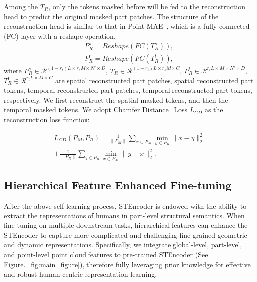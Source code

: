 Among the $T_R$, only the tokens masked before will be fed to the reconstruction head to predict the original masked part patches. The structure of the reconstruction head is similar to that in Point-MAE~\cite{pang2022masked}, which is a fully connected (FC) layer with a reshape operation.
\begin{equation}
    \begin{aligned}
    P^s_R = Reshape(FC(T^s_R)), \\
    P^t_R = Reshape(FC(T^t_R)), 
    \end{aligned}
\end{equation}
where $P^s_R \in \mathcal{R}^{(1-r_t)L \times r_sM \times N' \times D}$, $T^s_R \in \mathcal{R}^{(1-r_t)L \times r_sM \times C}$, $P^t_R \in \mathcal{R}^{r_tL \times M \times N' \times D}$, $T^t_R \in \mathcal{R}^{r_tL \times M \times C}$ are spatial reconstructed part patches, spatial reconstructed part tokens, temporal reconstructed part patches, temporal reconstructed part tokens, respectively.
We first reconstruct the spatial masked tokens, and then the temporal masked tokens. We adopt Chamfer Distance~\cite{fan2017point} Loss $L_{CD}$ as the reconstruction loss function:

\begin{equation}
    \begin{aligned}
    L_{CD} (P_M,P_R) = \frac{1}{\|P_M\|}\sum_{x \in P_M}\min_{y \in P_R}\|x-y\|_{2}^2 \\
    +\frac{1}{\|P_R\|}\sum_{y \in P_R}\min_{x \in P_M}\| y-x \|_{2}^2.
    \end{aligned}
\end{equation}

\subsection{Hierarchical Feature Enhanced Fine-tuning}
\label{subsec:finetine}
After the above self-learning process, STEncoder is endowed with the ability to extract the representations of humans in part-level structural semantics. When fine-tuning on multiple downstream tasks, hierarchical features can enhance the STEncoder to capture more complicated and challenging fine-grained geometric and dynamic representations.
Specifically, we integrate global-level, part-level, and point-level point cloud features to pre-trained STEncoder (See Figure.~\ref{fig:main_figure}), therefore fully leveraging prior knowledge for effective and robust human-centric representation learning. 
 


